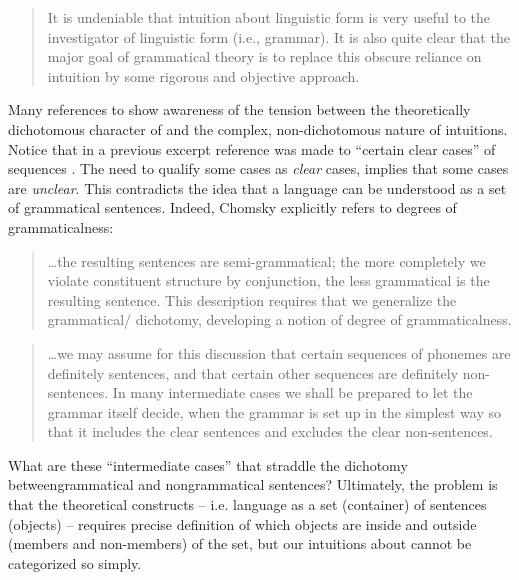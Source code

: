 \begin{quote}	
It is undeniable that intuition about linguistic form is very useful to the investigator of linguistic form (i.e., grammar). It is also quite clear that the major goal of grammatical theory is to replace this obscure reliance on intuition by some rigorous and objective approach. \citep[93-94]{Chomsky1957}
\end{quote}

  Many references to  show awareness of the tension between the theoretically dichotomous character of  and the complex, non-dichotomous nature of  intuitions. Notice that in a previous excerpt reference was made to “certain clear cases” of  sequences \citep[113]{Chomsky1956}. The need to qualify some cases as \textit{clear} cases, implies that some cases are \textit{unclear}. This contradicts the idea that a language can be understood as a set of grammatical sentences. Indeed, Chomsky explicitly refers to degrees of grammaticalness: 

\begin{quote}	
…the resulting sentences are semi-grammatical; the more completely we violate constituent structure by conjunction, the less grammatical is the resulting sentence. This description requires that we generalize the grammatical/ dichotomy, developing a notion of degree of grammaticalness. \citep[36]{Chomsky1957}
\end{quote}

\begin{quote}	
…we may assume for this discussion that certain sequences of phonemes are definitely sentences, and that certain other sequences are definitely non-sentences. In many intermediate cases we shall be prepared to let the grammar itself decide, when the grammar is set up in the simplest way so that it includes the clear sentences and excludes the clear non-sentences. \citep[14]{Chomsky1957}
\end{quote}

  What are these “intermediate cases” that straddle the dichotomy between\linebreak grammatical and nongrammatical sentences? Ultimately, the problem is that the theoretical constructs -- i.e. language as a set (container) of sentences (objects) -- requires precise definition of which objects are inside and outside (members and non-members) of the set, but our intuitions about  cannot be categorized so simply.

